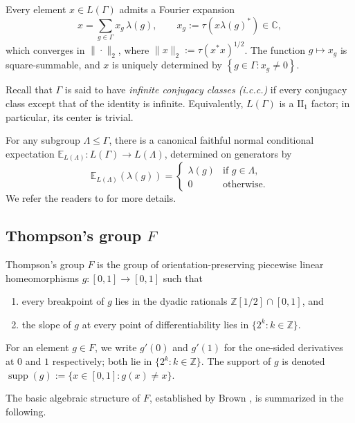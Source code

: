 \documentclass[11pt]{amsart}
\theoremstyle{definition}
\newcommand{\C}{\mathbb{C}}
\newcommand{\Z}{\mathbb{Z}}
\newcommand{\supp}{\operatorname{supp}}
\newcommand{\EE}{\mathbb{E}}
\begin{document}
Every element $x \in L(\Gamma)$ admits a Fourier expansion
\[
x = \sum_{g \in \Gamma} x_g \, \lambda(g), \qquad x_g := \tau(x \lambda(g)^*) \in \C,
\]
which converges in $\|\cdot\|_2$, where $\|x\|_2 := \tau(x^* x)^{1/2}$. The function $g \mapsto x_g$ is square-summable, and $x$ is uniquely determined by $\left \{g \in \Gamma : x_g \neq 0\right\}$.

Recall that $\Gamma$ is said to have \emph{infinite conjugacy classes (i.c.c.)} if every conjugacy class except that of the identity is infinite. Equivalently, $L(\Gamma)$ is a $\mathrm{II}_1$ factor; in particular, its center is trivial.

For any subgroup $\Lambda \le \Gamma$, there is a canonical faithful normal conditional expectation $\EE_{L(\Lambda)} \colon L(\Gamma) \to L(\Lambda)$, determined on generators by
\[
\EE_{L(\Lambda)}(\lambda(g)) = \begin{cases} \lambda(g) & \text{if } g \in \Lambda, \\ 0 & \text{otherwise.} \end{cases}
\]
We refer the readers to \cite[Chapter~2]{brown2008textrm} for more details. 
\subsection{Thompson's group \texorpdfstring{$F$}{}}

Thompson's group $F$ is the group of orientation-preserving piecewise linear homeomorphisms $g \colon [0,1] \to [0,1]$ such that
\begin{enumerate}
\item every breakpoint of $g$ lies in the dyadic rationals $\Z[1/2] \cap [0,1]$, and
\item the slope of $g$ at every point of differentiability lies in $\{2^k : k \in \Z\}$.
\end{enumerate}
For an element $g \in F$, we write $g'(0)$ and $g'(1)$ for the one-sided derivatives at $0$ and $1$ respectively; both lie in $\{2^k : k \in \Z\}$. The support of $g$ is denoted $\supp(g) := \{x \in [0,1] : g(x) \neq x\}$.

The basic algebraic structure of $F$, established by Brown \cite{Brown87}, is summarized in the following.
\end{document}
